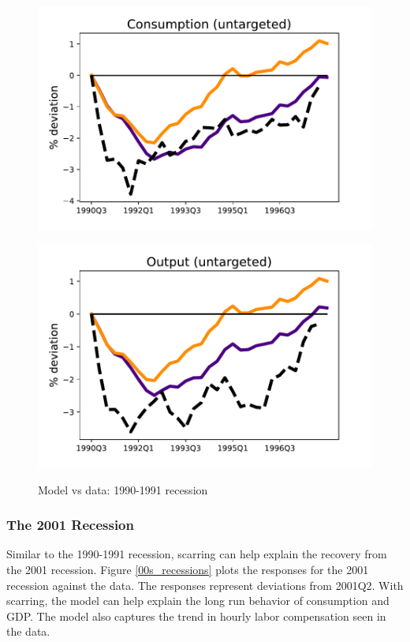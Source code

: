 \begin{figure}[H]
\medskip
\begin{minipage}{0.51\textwidth}
\includegraphics[scale=.57]{text/Chapter1/Figures/90s/PCE_IPR_90s_83Q1}
\label{fig:c}
\end{minipage}\hspace*{\fill}
\begin{minipage}{0.51\textwidth}
\includegraphics[scale=.57]{text/Chapter1/Figures/90s/GDP_IPR_90s_83Q1}
 \label{fig:d}
\end{minipage}
\caption{Model vs data: 1990-1991 recession}
\label{90s_recession}
\end{figure}

\subsubsection{The 2001 Recession}

Similar to the 1990-1991 recession, scarring can help explain the recovery from the 2001 recession. Figure \ref{00s_recessions} plots the responses for the 2001 recession against the data. The responses represent deviations from 2001Q2. With scarring, the model can help explain the long run behavior of consumption and GDP. The model also captures the trend in hourly labor compensation seen in the data. 



